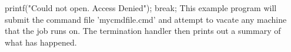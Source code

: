 printf("Could not open. Access Denied\n");
			break;
This example program will submit the command file 'mycmdfile.cmd' and attempt
to vacate any machine that the job runs on. The termination
handler then prints out a summary of what has happened.

    

